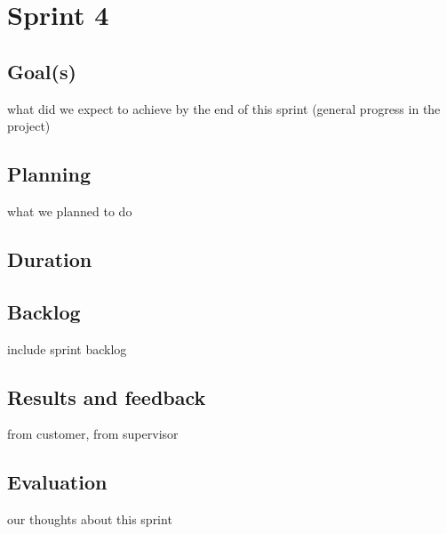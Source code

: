 

\chapter{Sprint 4}
\label{Sprint0}

\section{Goal(s)}
what did we expect to achieve by the end of this sprint (general progress in the project)

\section{Planning}
what we planned to do
\section{Duration}
\section{Backlog}
include sprint backlog
\section{Results and feedback}
from customer, from supervisor
\section{Evaluation}
our thoughts about this sprint